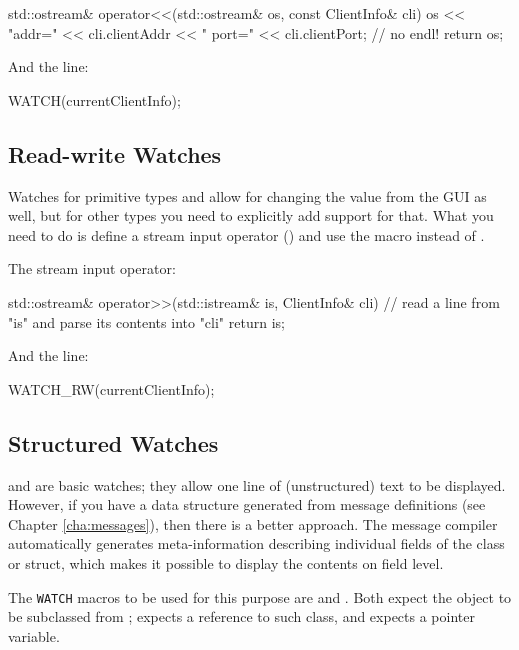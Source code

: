 \begin{cpp}
std::ostream& operator<<(std::ostream& os, const ClientInfo& cli)
{
    os << "addr=" << cli.clientAddr << "  port=" << cli.clientPort; // no endl!
    return os;
}
\end{cpp}

And the  line:

\begin{cpp}
WATCH(currentClientInfo);
\end{cpp}


\subsection{Read-write Watches}

Watches for primitive types and  allow for changing
the value from the GUI as well, but for other types you need to explicitly
add support for that. What you need to do is define a stream input
operator () and use the  macro instead of
.

The stream input operator:

\begin{cpp}
std::ostream& operator>>(std::istream& is, ClientInfo& cli)
{
    // read a line from "is" and parse its contents into "cli"
    return is;
}
\end{cpp}

And the  line:

\begin{cpp}
WATCH_RW(currentClientInfo);
\end{cpp}


\subsection{Structured Watches}

 and  are basic watches; they allow one
line of (unstructured) text to be displayed. However, if you have a
data structure generated from message definitions (see Chapter \ref{cha:messages}),
then there is a better approach. The message compiler automatically generates
meta-information describing individual fields of the class or struct,
which makes it possible to display the contents on field level.

The \texttt{WATCH} macros to be used for this purpose are 
and . Both expect the object to be subclassed from
;  expects a reference to such class,
and  expects a pointer variable.

